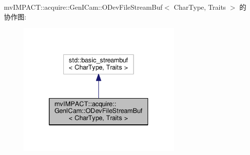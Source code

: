 mv\+I\+M\+P\+A\+C\+T\+:\+:acquire\+:\+:Gen\+I\+Cam\+:\+:O\+Dev\+File\+Stream\+Buf$<$ Char\+Type, Traits $>$ 的协作图\+:
\nopagebreak
\begin{figure}[H]
\begin{center}
\leavevmode
\includegraphics[width=232pt]{classmv_i_m_p_a_c_t_1_1acquire_1_1_gen_i_cam_1_1_o_dev_file_stream_buf__coll__graph}
\end{center}
\end{figure}
